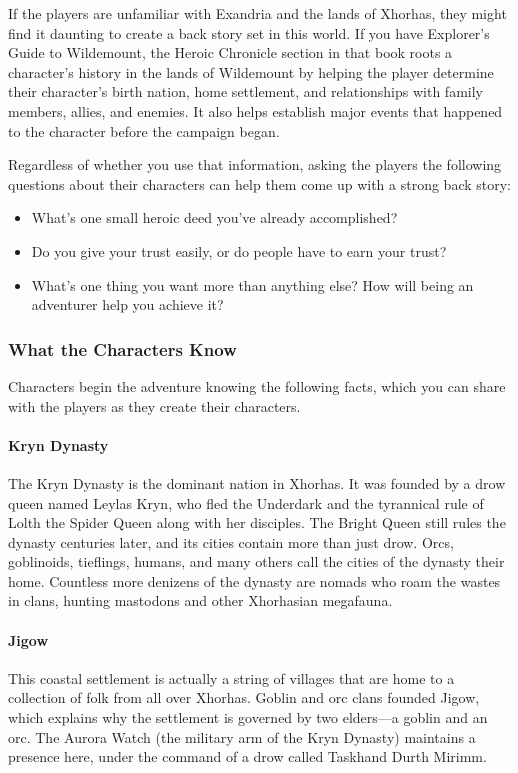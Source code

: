 \documentclass[10pt,a4paper,twoside,twocolumn,openany,nodeprecatedcode]{dndbook}
\begin{document}
If the players are unfamiliar with Exandria and the lands of Xhorhas, they might find it daunting to create a back story set in this world. If you have Explorer's Guide to Wildemount, the Heroic Chronicle section in that book roots a character's history in the lands of Wildemount by helping the player determine their character's birth nation, home settlement, and relationships with family members, allies, and enemies. It also helps establish major events that happened to the character before the campaign began.

Regardless of whether you use that information, asking the players the following questions about their characters can help them come up with a strong back story:


\begin{itemize}
\item What's one small heroic deed you've already accomplished?
\item Do you give your trust easily, or do people have to earn your trust?
\item What's one thing you want more than anything else? How will being an adventurer help you achieve it?
\end{itemize}

\subsubsection{What the Characters Know}
Characters begin the adventure knowing the following facts, which you can share with the players as they create their characters.

\paragraph{Kryn Dynasty}
The Kryn Dynasty is the dominant nation in Xhorhas. It was founded by a drow queen named Leylas Kryn, who fled the Underdark and the tyrannical rule of Lolth the Spider Queen along with her disciples. The Bright Queen still rules the dynasty centuries later, and its cities contain more than just drow. Orcs, goblinoids, tieflings, humans, and many others call the cities of the dynasty their home. Countless more denizens of the dynasty are nomads who roam the wastes in clans, hunting mastodons and other Xhorhasian megafauna.

\paragraph{Jigow}
This coastal settlement is actually a string of villages that are home to a collection of folk from all over Xhorhas. Goblin and orc clans founded Jigow, which explains why the settlement is governed by two elders—a goblin and an orc. The Aurora Watch (the military arm of the Kryn Dynasty) maintains a presence here, under the command of a drow called Taskhand Durth Mirimm.
\end{document}
